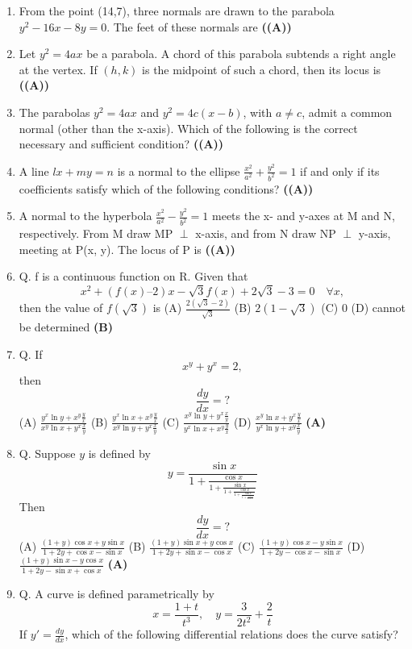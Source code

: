 \documentclass{article}
\begin{document}
\begin{enumerate}
\item From the point (14,7), three normals are drawn to the parabola $y^2 - 16x - 8y = 0$. The feet of these normals are \hfill \textbf{((A))}
\item Let $y^2 = 4ax$ be a parabola. A chord of this parabola subtends a right angle at the vertex. If $(h, k)$ is the midpoint of such a chord, then its locus is \hfill \textbf{((A))}
\item The parabolas $y^2 = 4ax$ and $y^2 = 4c (x - b)$, with $a \neq c$, admit a common normal (other than the x-axis). Which of the following is the correct necessary and sufficient condition? \hfill \textbf{((A))}
\item A line $lx + my = n$ is a normal to the ellipse $\frac{x^2}{a^2} + \frac{y^2}{b^2} = 1$ if and only if its coefficients satisfy which of the following conditions? \hfill \textbf{((A))}
\item A normal to the hyperbola $\frac{x^2}{a^2} - \frac{y^2}{b^2} = 1$ meets the x- and y-axes at M and N, respectively. From M draw MP $\perp$ x-axis, and from N draw NP $\perp$ y-axis, meeting at P(x, y). The locus of P is \hfill \textbf{((A))}
\item Q. f is a continuous function on R. Given that
$$x^2 + (f(x) – 2) x - \sqrt{3} f(x) + 2\sqrt{3}-3 = 0 \quad \forall x,$$then the value of $f(\sqrt{3})$ is
(A) $\frac{2(\sqrt{3}-2)}{\sqrt{3}}$
(B) $2(1 - \sqrt{3})$
(C) $0$
(D) cannot be determined \hfill \textbf{(B)}
\item Q. If
$$x^y + y^x = 2,$$then
$$\frac{dy}{dx} =?$$
(A) $\frac{y^x \ln y + x^y \frac{y}{x}}{x^y \ln x + y^x \frac{x}{y}}$
(B) $\frac{y^x \ln x + x^y \frac{y}{x}}{x^y \ln y + y^x \frac{x}{y}}$
(C) $\frac{x^y \ln y + y^x \frac{x}{y}}{y^x \ln x + x^y \frac{y}{x}}$
(D) $\frac{x^y \ln x + y^x \frac{y}{x}}{y^x \ln y + x^y \frac{x}{y}}$ \hfill \textbf{(A)}
\item Q. Suppose $y$ is defined by
$$y = \frac{\sin x}{1 + \frac{\cos x}{1 + \frac{\sin x}{1 + \frac{\cos x}{1 + \frac{\sin x}{1 + \frac{\cos x}{1+...}}}}}}$$Then
$$\frac{dy}{dx} =?$$
(A) $\frac{(1+y) \cos x + y \sin x}{1 + 2y + \cos x - \sin x}$
(B) $\frac{(1 + y) \sin x + y \cos x}{1 + 2y + \sin x - \cos x}$
(C) $\frac{(1 + y) \cos x - y \sin x}{1 + 2y - \cos x - \sin x}$
(D) $\frac{(1 + y) \sin x - y \cos x}{1 + 2y - \sin x + \cos x}$ \hfill \textbf{(A)}
\item Q. A curve is defined parametrically by
$$x = \frac{1+t}{t^3}, \quad y= \frac{3}{2t^2} + \frac{2}{t}$$If $y' = \frac{dy}{dx}$, which of the following differential relations does the curve satisfy?

\end{enumerate}
\end{document}
